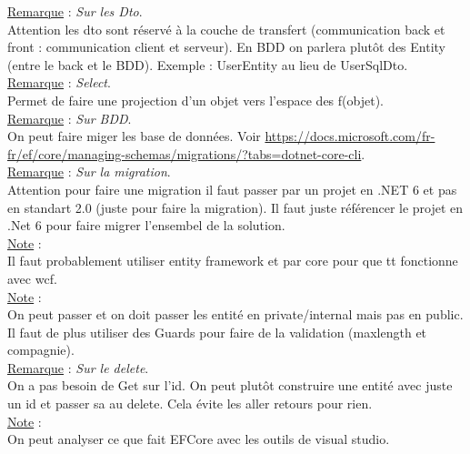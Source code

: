 \documentclass[a4paper,12pt,twoside]{article}
\newcommand{\rem}[2]{\noindent\underline{Remarque} : \textit{#1}.\\ \indent #2}
\newcommand{\note}[1]{\noindent\underline{Note} : \\ \indent #1}
\begin{document}
\rem{Sur les Dto}{Attention les dto sont réservé à la couche de transfert (communication back et front : communication client et serveur). En BDD on parlera plutôt des Entity (entre le back et le BDD). Exemple : UserEntity au lieu de UserSqlDto.}\\

\rem{Select}{Permet de faire une projection d'un objet vers l'espace des f(objet).}\\

\rem{Sur BDD}{On peut faire miger les base de données. Voir \url{https://docs.microsoft.com/fr-fr/ef/core/managing-schemas/migrations/?tabs=dotnet-core-cli}.}\\

\rem{Sur la migration}{Attention pour faire une migration il faut passer par un projet en .NET 6 et pas en standart 2.0 (juste pour faire la migration). Il faut juste référencer le projet en .Net 6 pour faire migrer l'ensembel de la solution.}\\

\note{Il faut probablement utiliser entity framework et par core pour que tt fonctionne avec wcf.}\\

\note{On peut passer et on doit passer les entité en private/internal mais pas en public. Il faut de plus utiliser des Guards pour faire de la validation (maxlength et compagnie).}\\

\rem{Sur le delete}{On a pas besoin de Get sur l'id. On peut plutôt construire une entité avec juste un id et passer sa au delete. Cela évite les aller retours pour rien.}\\

\note{On peut analyser ce que fait EFCore avec les outils de visual studio.}\\






\newpage
\printglossary[type=\acronymtype]%
\glsaddallunused %
\printglossary[type = main,nonumberlist]%
\end{document}

